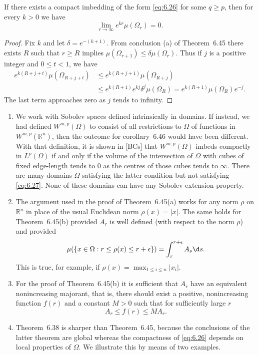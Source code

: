 \begin{corollary}
  If there exists a compact imbedding of the form \eqref{eq:6.26}
  for some $q\geq p$, then for every $k>0$ we have
  \begin{equation}\label{eq:6.27}
    \lim_{r\to\infty} e^{kr} \mu(\Omega_r) = 0.
  \end{equation}
\end{corollary}

\begin{proof}
  Fix $k$ and let $\delta=e^{-(k+1)}$. From conclusion (a) of Theorem~6.45
  there exists $R$ such that $r\geq R$ implies $\mu(\Omega_{r+1})\leq\delta\mu(\Omega_r)$.
  Thus if $j$ is a positive integer and $0\leq t<1$, we have
  \begin{align*}
    e^{k(R+j+t)} \mu(\Omega_{R+j+t})
    & \leq e^{k(R+j+1)} \mu(\Omega_{R+j}) \\
    & \leq e^{k(R+1)} e^{kj} \delta^j \mu(\Omega_R)
      = e^{k(R+1)} \mu(\Omega_R) e^{-j}.
  \end{align*}
  The last term approaches zero as $j$ tends to infinity.
\end{proof}


\begin{remarks}
  \begin{enumerate}[1.]
    \item We work with Sobolev spaces defined intrinsically in domains.
      If instead, we had defined $W^{m,p}(\Omega)$ to consist of all restrictions
      to $\Omega$ of functions in $W^{m,p}(\mathbb{R}^n)$, then the outcome for
      corollary~6.46 would have been different. With that definition,
      it is shown in [BCs] that $W^{m,p}(\Omega)$ imbeds compactly
      in $L^p(\Omega)$ if and only if the volume of the intersection of $\Omega$
      with cubes of fixed edge-length tends to $0$ as the centres of those
      cubes tends to $\infty$. There are many domains $\Omega$ satisfying
      the latter condition but not satisfying \eqref{eq:6.27}. None of these
      domains can have any Sobolev extension property.
    \item The argument used in the proof of Theorem~6.45(a) works for any
      norm $\rho$ on $\mathbb{R}^n$ in place of the usual Euclidean norm
      $\rho(x) = |x|$. The same holds for Theorem~6.45(b) provided $A_r$
      is well defined (with respect to the norm $\rho$) and provided
      \[ \mu(\{x\in\Omega: r\leq \rho(x)\leq r+\epsilon\}) = \int_r^{r+\epsilon} A_s \d s. \]
      This is true, for example, if $\rho(x) = \max_{1\leq i\leq n} |x_i|$.
    \item For the proof of Theorem~6.45(b) it is sufficient that $A_r$
      have an equivalent nonincreasing majorant, that is, there should
      exist a positive, nonincreasing function $f(r)$ and a constant
      $M>0$ such that for sufficiently large $r$
      \[ A_r \leq f(r) \leq MA_r. \]
    \item Theorem~6.38 is sharper than Theorem~6.45, because the conclusions
      of the latter theorem are global whereas the compactness of \eqref{eq:6.26}
      depends on local properties of $\Omega$. We illustrate this by means of
      two examples.
  \end{enumerate}
\end{remarks}


